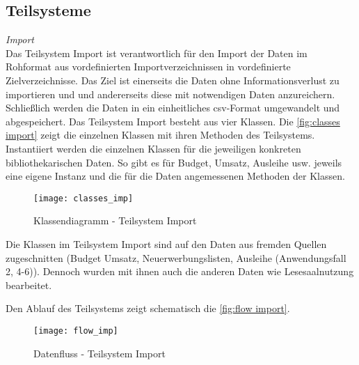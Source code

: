 
        

    \subsection{Teilsysteme}
    
    \textit{Import}\\
    Das Teilsystem Import ist verantwortlich für den Import der Daten im Rohformat aus vordefinierten Importverzeichnissen in vordefinierte Zielverzeichnisse. Das Ziel
    ist einerseits die Daten ohne Informationsverlust zu importieren und und andererseits diese mit notwendigen Daten anzureichern. Schließlich werden die Daten
    in ein einheitliches csv-Format umgewandelt und abgespeichert.
    Das Teilsystem Import besteht aus vier Klassen. Die \autoref{fig:classes import} zeigt die einzelnen Klassen mit ihren Methoden des 
    Teilsystems. Instantiiert werden die einzelnen Klassen für die jeweiligen konkreten bibliothekarischen Daten. So gibt es für Budget, Umsatz, Ausleihe usw.
    jeweils eine eigene Instanz und die für die Daten angemessenen Methoden der Klassen.
    
    \begin{figure}[H]
        \centering
            \texttt{[image: classes\_imp]}
            \caption{Klassendiagramm - Teilsystem Import}
            \label{fig:classes import}
    \end{figure}

    Die Klassen im Teilsystem Import sind auf den Daten aus fremden Quellen zugeschnitten
    (Budget Umsatz, Neuerwerbungslisten, Ausleihe (Anwendungsfall 2, 4-6)). Dennoch wurden mit ihnen auch die anderen Daten
    wie Lesesaalnutzung bearbeitet. 

    Den Ablauf des Teilsystems zeigt schematisch die \autoref{fig:flow import}.

    \begin{figure}[H]
        \centering
            \texttt{[image: flow\_imp]}
            \caption{Datenfluss - Teilsystem Import}
            \label{fig:flow import}
    \end{figure}


